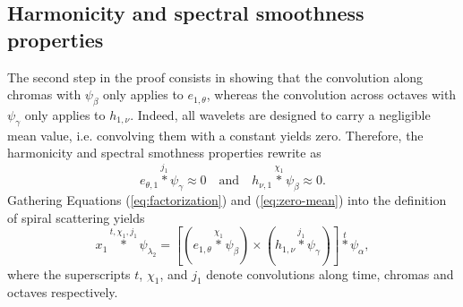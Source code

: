 \documentclass[twoside,a4paper]{article}
\begin{document}
\subsection{Harmonicity and spectral smoothness properties}
The second step in the proof consists in showing that the convolution along chromas with $\psi_\beta$ only applies to $e_{1,\theta}$, whereas the convolution across octaves with $\psi_\gamma$ only applies to $h_{1,\nu}$. Indeed, all wavelets are designed to carry a negligible mean value, i.e. convolving them with a constant yields zero. Therefore, the harmonicity and spectral smothness properties rewrite as
\begin{equation}
e_{\theta,1}\overset{j_{1}}{\ast}\psi_{\gamma}\approx0
\quad\mbox{and}\quad
h_{\nu,1}\overset{\chi_{1}}{\ast}\psi_{\beta}\approx0.
\label{eq:zero-mean}
\end{equation}
Gathering Equations (\ref{eq:factorization}) and (\ref{eq:zero-mean}) into the definition of spiral scattering yields
\begin{equation}
x_1 \overset{t,\chi_{1},j_{1}}{\ast} \psi_{\lambda_2} =
\left[
\left( e_{1,\theta} \overset{\chi_{1}}{\ast} \psi_{\beta} \right)
\times
\left( h_{1,\nu} \overset{j_{1}}{\ast} \psi_{\gamma} \right)
\right]
\overset{t}{\ast} \psi_\alpha,
\end{equation}
where the superscripts $t$, $\chi_{1}$, and $j_{1}$ denote convolutions along time, chromas and octaves respectively.
\end{document}
